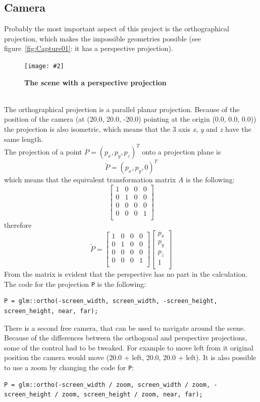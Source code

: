 \documentclass[10pt, a4paper]{article}
\newcommand{\figuremacro}[5]{
    \begin{figure}[#1]
        \centering
        \texttt{[image: \#2]}
        \caption[#3]{\textbf{#3}#4}
        \label{fig:#2}
    \end{figure}
}
\begin{document}
\subsection{Camera}	
Probably the most important aspect of this project is the orthographical projection, which makes the impossible geometries possible (see figure~\ref{fig:Capture01}: it has a perspective projection).
\figuremacro{h}{Capture06}{The scene with a perspective projection}{}{1.0} \\ The orthographical projection is a parallel planar projection. Because of the position of the camera (at (20.0, 20.0, -20.0) pointing at the origin (0.0, 0.0, 0.0)) the projection is also isometric, which means that the 3 axis \textit{x}, \textit{y} and \textit{z} have the same length. \\ The projection of a point $P = (p_x, p_y, p_z)^T$ onto a projection plane is
\[
	\tilde{P} = (p_x, p_y, 0)^T
\]
which means that the equivalent transformation matrix $A$ is the following:
\[
\left[ {\begin{array}{cccc}
	1 & 0 & 0 & 0\\
	0 & 1 & 0 & 0\\
	0 & 0 & 0 & 0\\
	0 & 0 & 0 & 1\\
	\end{array} } \right]
\]
therefore
\[
\tilde{P} =
\left[ {\begin{array}{cccc}
	1 & 0 & 0 & 0\\
	0 & 1 & 0 & 0\\
	0 & 0 & 0 & 0\\
	0 & 0 & 0 & 1\\
	\end{array} } \right]
\left[ {\begin{array}{c}
	p_x\\
	p_y\\
	p_z\\
	1\\
	\end{array} } \right]
\]
From the matrix is evident that the perspective has no part in the calculation. \\
The code for the projection \texttt{P} is the following:
\begin{lstlisting}
P = glm::ortho(-screen_width, screen_width, -screen_height, screen_height, near, far);
\end{lstlisting}
There is a second free camera, that can be used to navigate around the scene. \\
Because of the differences between the orthogonal and perspective projections, some of the control had to be tweaked. For example to move left from it original position the camera would move (20.0 + left, 20.0, 20.0 + left). It is also possible to use a zoom by changing the code for \texttt{P}:
\begin{lstlisting}
P = glm::ortho(-screen_width / zoom, screen_width / zoom, -screen_height / zoom, screen_height / zoom, near, far);
\end{lstlisting}
\end{document}
